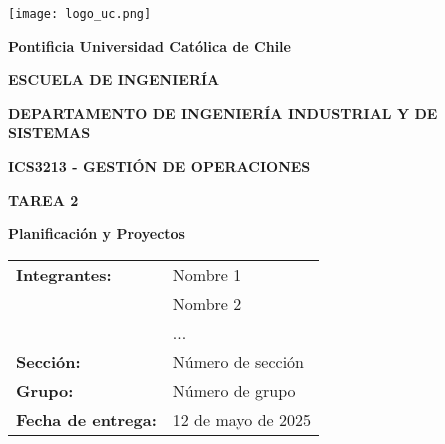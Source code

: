 \begin{titlepage}
    \centering
    \vspace*{1cm}
    
    \texttt{[image: logo\_uc.png]}
    
    \vspace{1.5cm}
    
    \textbf{\Large Pontificia Universidad Católica de Chile}
    
    \vspace{0.5cm}
    
    \textbf{\large ESCUELA DE INGENIERÍA}
    
    \textbf{\large DEPARTAMENTO DE INGENIERÍA INDUSTRIAL Y DE SISTEMAS}
    
    \vspace{1cm}
    
    \textbf{\Large ICS3213 - GESTIÓN DE OPERACIONES}
    
    \vspace{1.5cm}
    
    \textbf{\Huge TAREA 2}
    
    \vspace{1.5cm}
    
    \textbf{\Large Planificación y Proyectos}
    
    \vspace{2cm}
    
    \begin{tabular}{ll}
        \textbf{Integrantes:} & Nombre 1 \\
        & Nombre 2 \\
        & ... \\
        \textbf{Sección:} & Número de sección \\
        \textbf{Grupo:} & Número de grupo \\
        \textbf{Fecha de entrega:} & 12 de mayo de 2025 \\
    \end{tabular}
    
    \vfill
\end{titlepage}